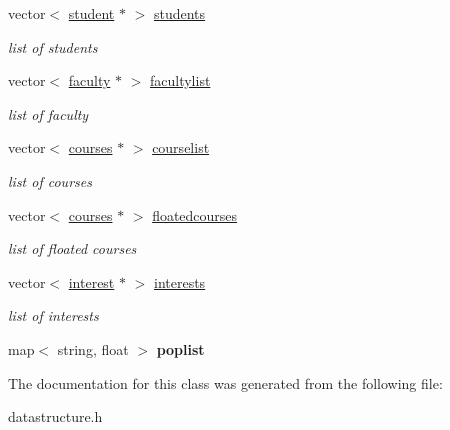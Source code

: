 \begin{DoxyCompactItemize}
\item 
\hypertarget{classdepartment_a505cd1dfbf80ba214f1a2cdd138845c3}{vector$<$ \hyperlink{classstudent}{student} $\ast$ $>$ \hyperlink{classdepartment_a505cd1dfbf80ba214f1a2cdd138845c3}{students}}\label{classdepartment_a505cd1dfbf80ba214f1a2cdd138845c3}

\begin{DoxyCompactList}\small\item\em list of students \end{DoxyCompactList}\item 
\hypertarget{classdepartment_aeb0c7bc355c116304bbc5b1f5a385cd0}{vector$<$ \hyperlink{classfaculty}{faculty} $\ast$ $>$ \hyperlink{classdepartment_aeb0c7bc355c116304bbc5b1f5a385cd0}{facultylist}}\label{classdepartment_aeb0c7bc355c116304bbc5b1f5a385cd0}

\begin{DoxyCompactList}\small\item\em list of faculty \end{DoxyCompactList}\item 
\hypertarget{classdepartment_a1b5a43ed6e27d217ccc17b4fffbbfdac}{vector$<$ \hyperlink{classcourses}{courses} $\ast$ $>$ \hyperlink{classdepartment_a1b5a43ed6e27d217ccc17b4fffbbfdac}{courselist}}\label{classdepartment_a1b5a43ed6e27d217ccc17b4fffbbfdac}

\begin{DoxyCompactList}\small\item\em list of courses \end{DoxyCompactList}\item 
\hypertarget{classdepartment_a593f5a3d92d6cc9fe212a4a2acf69aec}{vector$<$ \hyperlink{classcourses}{courses} $\ast$ $>$ \hyperlink{classdepartment_a593f5a3d92d6cc9fe212a4a2acf69aec}{floatedcourses}}\label{classdepartment_a593f5a3d92d6cc9fe212a4a2acf69aec}

\begin{DoxyCompactList}\small\item\em list of floated courses \end{DoxyCompactList}\item 
\hypertarget{classdepartment_a053fb5b530dd07ddb129ff8b5dd413b7}{vector$<$ \hyperlink{classinterest}{interest} $\ast$ $>$ \hyperlink{classdepartment_a053fb5b530dd07ddb129ff8b5dd413b7}{interests}}\label{classdepartment_a053fb5b530dd07ddb129ff8b5dd413b7}

\begin{DoxyCompactList}\small\item\em list of interests \end{DoxyCompactList}\item 
\hypertarget{classdepartment_ac4db20fbf3782a2c6c1882461db63879}{map$<$ string, float $>$ {\bfseries poplist}}\label{classdepartment_ac4db20fbf3782a2c6c1882461db63879}

\end{DoxyCompactItemize}


\-The documentation for this class was generated from the following file\-:\begin{DoxyCompactItemize}
\item 
datastructure.\-h\end{DoxyCompactItemize}
